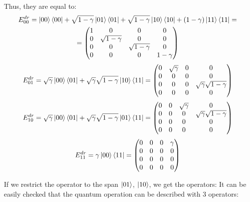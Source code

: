 \documentclass{report}
\begin{document}
Thus, they are equal to:
\begin{multline}
    E_{00}^{dr} = \ket{00}\bra{00} + \sqrt{1-\gamma}\ket{01}\bra{01} + \sqrt{1-\gamma}\ket{10}\bra{10} + (1-\gamma)\ket{11}\bra{11} = \\
    = \begin{pmatrix} 1 & 0 & 0 & 0 \\ 0 & \sqrt{1-\gamma} & 0 & 0 \\ 0 & 0 & \sqrt{1-\gamma} & 0 \\ 0 & 0 & 0 & 1-\gamma \end{pmatrix}
\end{multline}
\begin{equation}
    E_{01}^{dr} = \sqrt{\gamma}\ket{00}\bra{01} + \sqrt{\gamma}\sqrt{1-\gamma}\ket{10}\bra{11}
    = \begin{pmatrix} 0 & \sqrt{\gamma} & 0 & 0 \\ 0 & 0 & 0 & 0 \\ 0 & 0 & 0 & \sqrt{\gamma}\sqrt{1-\gamma} \\ 0 & 0 & 0 & 0 \end{pmatrix}
\end{equation}
\begin{equation}
    E_{10}^{dr} = \sqrt{\gamma}\ket{00}\bra{01} + \sqrt{\gamma}\sqrt{1-\gamma}\ket{01}\bra{11}  
    = \begin{pmatrix} 0 & 0 & \sqrt{\gamma} & 0 \\ 0 & 0 & 0 & \sqrt{\gamma}\sqrt{1-\gamma} \\ 0 & 0 & 0 & 0 \\ 0 & 0 & 0 & 0 \end{pmatrix}
\end{equation}
\begin{equation}
    E_{11}^{dr} = \gamma \ket{00}\bra{11}
    = \begin{pmatrix} 0 & 0 & 0 & \gamma \\ 0 & 0 & 0 & 0 \\ 0 & 0 & 0 & 0 \\ 0 & 0 & 0 & 0 \end{pmatrix}
\end{equation}

If we restrict the operator to the span {$\ket{01}$, $\ket{10}$}, we get the operators:
It can be easily checked that the quantum operation can be described with 3 operators:
\end{document}
